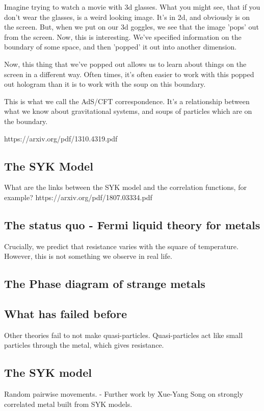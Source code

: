 \documentclass[11pt, oneside]{article}   	%
\theoremstyle{slanted}
\begin{document}
Imagine trying to watch a movie
with 3d glasses. What you might see, that if 
you don't wear the glasses, is a weird looking image. 
It's in 2d, and obviously is on the screen. 
But, when we put on our 3d goggles, we see that the image 'pops' 
out from the screen. Now, this is interesting. 
We've specified information on the boundary of 
some space, and then 'popped' it out into 
another dimension. 

Now, this thing that we've popped out allows 
us to learn about things on the screen 
in a different way. 
Often times, it's often easier to work 
with this popped out hologram than it is 
to work with the soup on this boundary. 

This is what we call the AdS/CFT correspondence. 
It's a relationship between what we know about gravitational systems, 
and soups of particles which are on the 
boundary. 

https://arxiv.org/pdf/1310.4319.pdf


\subsection{The SYK Model} 

What are the links between the SYK model and 
the correlation functions, for example?
https://arxiv.org/pdf/1807.03334.pdf



\subsection{The status quo - Fermi liquid theory for metals}

Crucially, we predict that resistance varies with the square of temperature. 
However, this is not something we observe in real life. 

\subsection{The Phase diagram of strange metals} 

\subsection{What has failed before} 
Other theories fail to not make quasi-particles. 
Quasi-particles act like small particles through the metal, 
which gives resistance. 

\subsection{The SYK model} 
Random pairwise movements. 
 - Further work by Xue-Yang Song on strongly correlated metal built 
 from SYK models.
\end{document}
